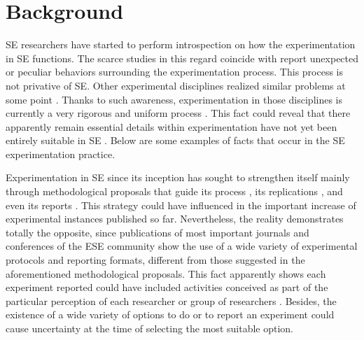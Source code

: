 \section{Background}\label{sec-background}
SE researchers have started to perform introspection on how the experimentation in SE functions. The scarce studies in this regard coincide with report unexpected or peculiar behaviors surrounding the experimentation process. This process is not privative of SE. Other experimental disciplines realized similar problems at some point \cite{Garcia-2012-Cienci-Abierta,Kumar-2014-design-experiment-bioprocessing}. Thanks to such awareness, experimentation in those disciplines is currently a very rigorous and uniform process \cite{stoker-2009-iLAP-bioinformatics,Jones-2007-FUGE,ko-2012-SMISB}. This fact could reveal that there apparently remain essential details within experimentation have not yet been entirely suitable in SE \cite{Vegas-2016-Crossover-Designs-ESE}. Below are some examples of facts that occur in the SE experimentation practice.

Experimentation in SE since its inception has sought to strengthen itself mainly through methodological proposals that guide its process \cite{Basili-1986-ESE,Juristo2001,Kitchenham2002-GuideLinesESE,Wohlin2000}, its replications \cite{Solari2006-ClasAnalLabPaq}, and even its reports \cite{Jedlitschka2005-GuideLinesESE,Carver2010-GuidelinesReplication,Kitchenham:2008b}. This strategy could have influenced in the important increase of experimental instances \cite{Sjoberg2005-surveyexperimentsESE,Zendler2001,Dieste2011-CompAnalMetaWhenWich} published so far. Nevertheless, the reality demonstrates totally the opposite, since publications of most important journals and conferences of the ESE community show the use of a wide variety of experimental protocols and reporting formats, different from those suggested in the aforementioned methodological proposals. This fact apparently shows each experiment reported could have included activities conceived as part of the particular perception of each researcher or group of researchers \cite{Reyes-2018-Statistical-Errors-in-SE}. Besides, the existence of a wide variety of options to do or to report an experiment could cause uncertainty at the time of selecting the most suitable option.

